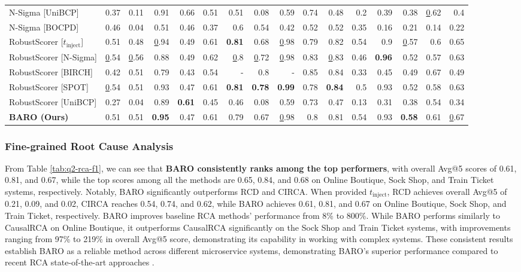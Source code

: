 \begin{table}[!t]
{\begin{tabular}{l|rrrrr|rrrrr|rrrrr}
N-Sigma {[}UniBCP{]} & 0.37 & 0.11 & 0.91 & 0.66 & 0.51 & 0.51 & 0.08 & 0.59 & 0.74 & 0.48 & 0.2 & 0.39 & 0.38 & {\ul 0.62} & 0.4 \\
N-Sigma {[}BOCPD{]} & 0.46 & 0.04 & 0.51 & 0.46 & 0.37 & 0.6 & 0.54 & 0.42 & 0.52 & 0.52 & 0.35 & 0.16 & 0.21 & 0.14 & 0.22 \\ \hline 
RobustScorer {[}$t_{\text{inject}}${]} & 0.51 & 0.48 & {\ul 0.94} & 0.49 & 0.61 & \textbf{0.81} & 0.68 & {\ul 0.98} & 0.79 & 0.82 & 0.54 & 0.9 & {\ul 0.57} & 0.6 & 0.65 \\
RobustScorer {[}N-Sigma{]} & {\ul 0.54} & {\ul 0.56} & 0.88 & 0.49 & 0.62 & {\ul 0.8} & {\ul 0.72} & {\ul 0.98} & 0.83 & {\ul 0.83} & 0.46 & \textbf{0.96} & 0.52 & 0.57 & 0.63 \\
RobustScorer {[}BIRCH{]} & 0.42 & 0.51 & 0.79 & 0.43 & 0.54 & - & 0.8 & - & 0.85 & 0.84 & 0.33 & 0.45 & 0.49 & 0.67 & 0.49 \\
RobustScorer {[}SPOT{]} & {\ul 0.54} & 0.51 & 0.93 & 0.47 & 0.61 & \textbf{0.81} & \textbf{0.78} & \textbf{0.99} & 0.78 & \textbf{0.84} & 0.5 & 0.93 & 0.52 & 0.58 & 0.63 \\
RobustScorer {[}UniBCP{]} & 0.27 & 0.04 & 0.89 & \textbf{0.61} & 0.45 & 0.46 & 0.08 & 0.59 & 0.73 & 0.47 & 0.13 & 0.31 & 0.38 & 0.54 & 0.34 \\ \hline
\textbf{BARO (Ours)} & 0.51 & 0.51 & \textbf{0.95} & 0.47 & 0.61 & 0.79 & 0.67 & {\ul 0.98} & 0.8 & 0.81 & 0.54 & 0.93 & \textbf{0.58} & 0.61 & {\ul 0.67} \\ \hline
\end{tabular}%
}
\vspace{-0.2cm}
\end{table}

\subsubsection{Fine-grained Root Cause Analysis} From Table \ref{tab:q2-rca-f1}, we can see that \textbf{BARO consistently ranks among the top performers}, with overall Avg@5 scores of 0.61, 0.81, and 0.67, while the top scores among all the methods are 0.65, 0.84, and 0.68 on Online Boutique, Sock Shop, and Train Ticket systems, respectively. Notably, BARO significantly outperforms RCD and CIRCA. When provided $t_{\text{inject}}$, RCD achieves overall Avg@5 of 0.21, 0.09, and 0.02, CIRCA reaches 0.54, 0.74, and 0.62, while BARO achieves 0.61, 0.81, and 0.67 on Online Boutique, Sock Shop, and Train Ticket, respectively. BARO improves baseline RCA methods' performance from 8\% to 800\%. While BARO performs similarly to CausalRCA on Online Boutique, it outperforms CausalRCA significantly on the Sock Shop and Train Ticket systems, with improvements ranging from 97\% to 219\% in overall Avg@5 score, demonstrating its capability in working with complex systems. These consistent results establish BARO as a reliable method across different microservice systems, demonstrating BARO's superior performance compared to recent RCA state-of-the-art approaches \cite{Xin2023CausalRCA, Azam2022rcd, Li2022Circa}. 

